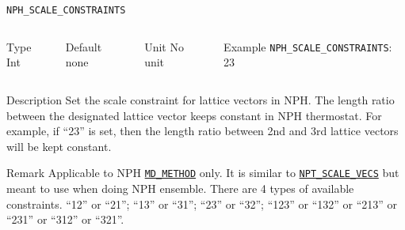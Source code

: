 \begin{frame}[allowframebreaks]{\texttt{NPH\_SCALE\_CONSTRAINTS}} \label{NPH_SCALE_CONSTRAINTS}
\vspace*{-12pt}
\begin{columns}
\begin{block}{Type}
Int
\end{block}

\begin{block}{Default}
none
\end{block}

\begin{block}{Unit}
No unit
\end{block}

\begin{block}{Example}
\texttt{NPH\_SCALE\_CONSTRAINTS}: 23
\end{block}
\end{columns}

\begin{block}{Description}
Set the scale constraint for lattice vectors in NPH. The length ratio between the designated lattice vector keeps constant in NPH thermostat. For example, if ``23'' is set, then the length ratio between 2nd and 3rd lattice vectors will be kept constant.
\end{block}

\begin{block}{Remark}
Applicable to NPH \hyperlink{MD_METHOD}{\texttt{MD\_METHOD}} only.
It is similar to \hyperlink{NPT\_SCALE\_VECS}{\texttt{NPT\_SCALE\_VECS}} but meant to use when doing NPH ensemble.
There are 4 types of available constraints. ``12'' or ``21''; ``13'' or ``31''; ``23'' or ``32''; ``123'' or ``132'' or ``213'' or ``231'' or ``312'' or ``321''.
\end{block}

\end{frame}




